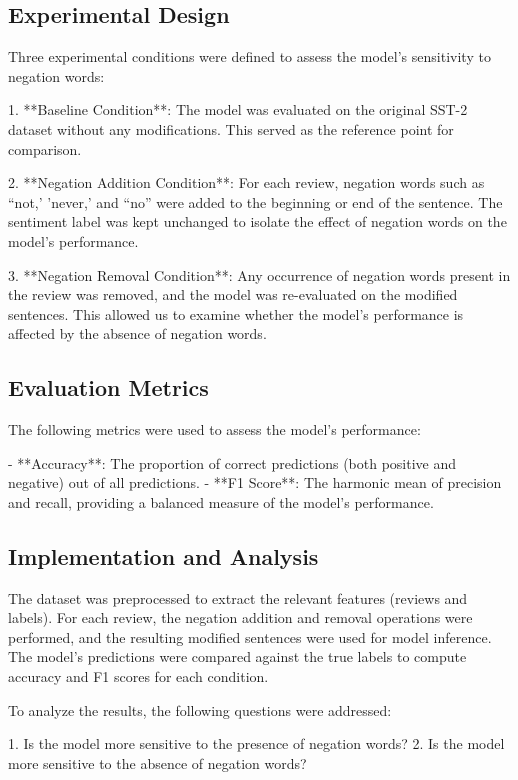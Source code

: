 \documentclass{article}
\begin{document}
\subsection{Experimental Design}

Three experimental conditions were defined to assess the model's sensitivity to negation words:

1. **Baseline Condition**: The model was evaluated on the original SST-2 dataset without any modifications. This served as the reference point for comparison.

2. **Negation Addition Condition**: For each review, negation words such as ``not,' 'never,' and ``no'' were added to the beginning or end of the sentence. The sentiment label was kept unchanged to isolate the effect of negation words on the model's performance.

3. **Negation Removal Condition**: Any occurrence of negation words present in the review was removed, and the model was re-evaluated on the modified sentences. This allowed us to examine whether the model's performance is affected by the absence of negation words.

\subsection{Evaluation Metrics}

The following metrics were used to assess the model's performance:

- **Accuracy**: The proportion of correct predictions (both positive and negative) out of all predictions.
- **F1 Score**: The harmonic mean of precision and recall, providing a balanced measure of the model's performance.

\subsection{Implementation and Analysis}

The dataset was preprocessed to extract the relevant features (reviews and labels). For each review, the negation addition and removal operations were performed, and the resulting modified sentences were used for model inference. The model's predictions were compared against the true labels to compute accuracy and F1 scores for each condition.

To analyze the results, the following questions were addressed:

1. Is the model more sensitive to the presence of negation words?
2. Is the model more sensitive to the absence of negation words?
\end{document}
